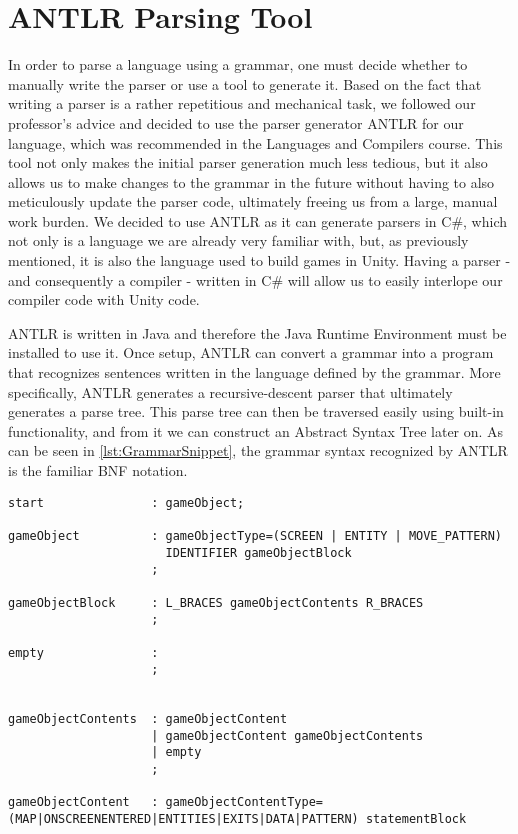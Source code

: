 \section{ANTLR Parsing Tool}\label{sec:ANTLRTool}
In order to parse a language using a grammar, one must decide whether to manually write the parser or use a tool to generate it\cite{crafting_a_compiler}.
Based on the fact that writing a parser is a rather repetitious and mechanical task, we followed our professor's advice and decided to use the parser generator ANTLR for our language, which was recommended in the Languages and Compilers course. 
This tool not only makes the initial parser generation much less tedious, but it also allows us to make changes to the grammar in the future without having to also meticulously update the parser code, ultimately freeing us from a large, manual work burden.
We decided to use ANTLR as it can generate parsers in C\#, which not only is a language we are already very familiar with, but, as previously mentioned, it is also the language used to build games in Unity. Having a parser - and consequently a compiler - written in C\# will allow us to easily interlope our compiler code with Unity code.


ANTLR is written in Java and therefore the Java Runtime Environment must be installed to use it. 
Once setup, ANTLR can convert a grammar into a program that recognizes sentences written in the language defined by the grammar.
More specifically, ANTLR generates a recursive-descent parser that ultimately generates a parse tree.
This parse tree can then be traversed easily using built-in functionality, and from it we can construct an Abstract Syntax Tree later on.
As can be seen in \ref{lst:GrammarSnippet}, the grammar syntax recognized by ANTLR is the familiar BNF notation.


\begin{lstlisting}[caption={A snippet of the \dazel{} grammar used by ANTLR to generate the parser}, label={lst:GrammarSnippet}]
start				: gameObject;

gameObject          : gameObjectType=(SCREEN | ENTITY | MOVE_PATTERN) 
					  IDENTIFIER gameObjectBlock
					;
						
gameObjectBlock     : L_BRACES gameObjectContents R_BRACES
					;

empty               : 
					;


gameObjectContents  : gameObjectContent
					| gameObjectContent gameObjectContents
					| empty
					;

gameObjectContent   : gameObjectContentType=(MAP|ONSCREENENTERED|ENTITIES|EXITS|DATA|PATTERN) statementBlock 
\end{lstlisting}

